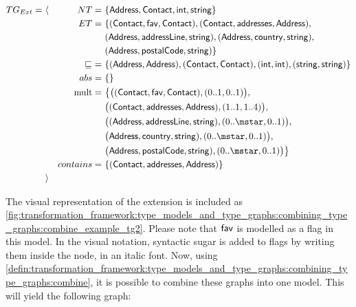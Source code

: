 \begin{align*}
TG_{Ext} =\ &\langle&
NT =\ &\{ \type{Address}, \type{Contact}, \type{int}, \type{string} \} \\&&
ET =\ &\{ 
( \type{Contact}, \type{fav}, \type{Contact} ),
( \type{Contact}, \type{addresses}, \type{Address} ), \\&&&
( \type{Address}, \type{addressLine}, \type{string} ),
( \type{Address}, \type{country}, \type{string} ),\\&&&
( \type{Address}, \type{postalCode}, \type{string} )
\} \\&&
\sqsubseteq\ =\ &\{
( \type{Address}, \type{Address} ),
( \type{Contact}, \type{Contact} ),
( \type{int}, \type{int} ),
( \type{string}, \type{string} )
\} \\&&
abs =\ &\{\} \\&&
\mathrm{mult} =\ &\big\{
\big( ( \type{Contact}, \type{fav}, \type{Contact} ), ( 0..1, 0..1 ) \big),\\&&&
\big( ( \type{Contact}, \type{addresses}, \type{Address} ), ( 1..1, 1..4 ) \big),\\&&&
\big( ( \type{Address}, \type{addressLine}, \type{string} ), ( 0..\mstar, 0..1 ) \big),\\&&&
\big( \type{Address}, \type{country}, \type{string} ), ( 0..\mstar, 0..1 ) \big),\\&&&
\big( \type{Address}, \type{postalCode}, \type{string} ), ( 0..\mstar, 0..1 ) \big)
\big\} \\&&
contains =\ &\{
( \type{Contact}, \type{addresses}, \type{Address} )
\}
\\&\rangle
\end{align*}

The visual representation of the extension is included as \cref{fig:transformation_framework:type_models_and_type_graphs:combining_type_graphs:combine_example_tg2}. Please note that $\mathsf{fav}$ is modelled as a flag in this model. In the visual notation, syntactic sugar is added to flags by writing them inside the node, in an italic font. Now, using \cref{defin:transformation_framework:type_models_and_type_graphs:combining_type_graphs:combine}, it is possible to combine these graphs into one model. This will yield the following graph:

